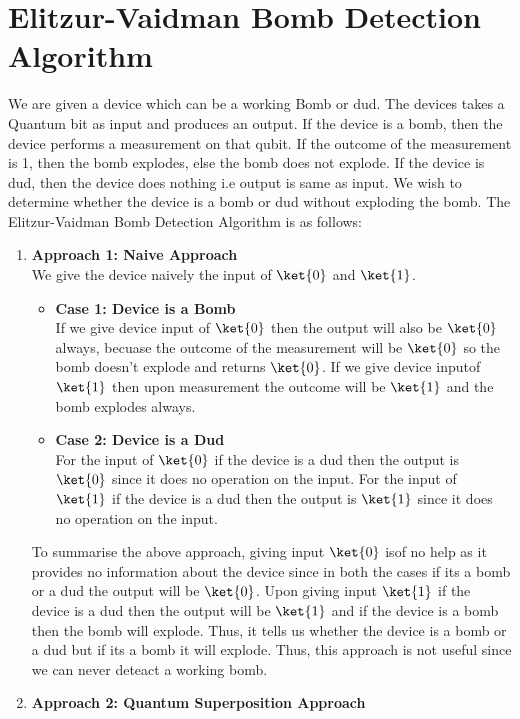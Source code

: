 \documentclass[12pt, oneside]{book}
\theoremstyle{definition}
\theoremstyle{definition}
\theoremstyle{remark}
\begin{document}
\section{Elitzur-Vaidman Bomb Detection Algorithm}
We are given a device which can be a working Bomb or dud. The devices takes a Quantum bit as input and produces an output.
If the device is a bomb, then the device performs a measurement on that qubit. If the outcome of the measurement is 1, then the bomb explodes, else the bomb does not explode.
If the device is dud, then the device does nothing i.e output is same as input.
We wish to determine whether the device is a bomb or dud without exploding the bomb. The Elitzur-Vaidman Bomb Detection Algorithm is as follows:
\begin{enumerate}
    \item \textbf{Approach 1: Naive Approach }\\We give the device naively the input of $\ket{0}$ and $\ket{1}$. 
    \begin{itemize} 
        \item \textbf{Case 1: Device is a Bomb}\\
        If we give device input of $\ket{0}$ then the output will also be $\ket{0}$ always, becuase the outcome of the measurement will be $\ket{0}$ so the bomb doesn't explode and returns $\ket{0}$. 
        If we give device inputof $\ket{1}$ then upon measurement the outcome will be $\ket{1}$ and the bomb explodes always.
        \item \textbf{Case 2: Device is a Dud}\\
        For the input of $\ket{0}$ if the device is a dud then the output is $\ket{0}$ since it does no operation on the input.
        For the input of $\ket{1}$ if the device is a dud then the output is $\ket{1}$ since it does no operation on the input.
    \end{itemize}
    To summarise the above approach, giving input $\ket{0}$ isof no help as it provides no information about the device since in both the cases if its a bomb or a dud the output will be $\ket{0}$. 
    Upon giving input $\ket{1}$ if the device is a dud then the output will be $\ket{1}$ and if the device is a bomb then the bomb will explode. Thus, it tells us whether the device is a bomb or a dud but if its a bomb it will explode. Thus, this approach is not useful since we can never deteact a working bomb.
    \item \textbf{Approach 2: Quantum Superposition Approach}\\

\end{enumerate}
\end{document}
